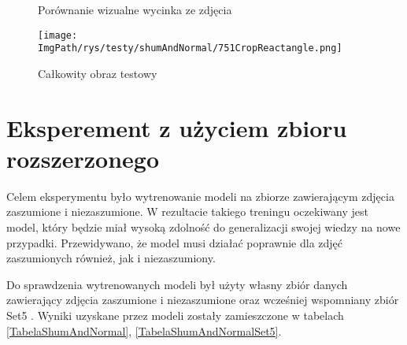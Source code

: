\documentclass[a4paper,12pt,twoside,openany]{report}
\newcommand{\ImgPath}{.}
\begin{document}
	\begin{figure}[!htbp]
		\centering
		\caption{Porównanie wizualne wycinka ze zdjęcia}
		\label{fig:cropShum}
	\end{figure}
	\begin{figure}[!htbp]
	\begin{center}
		\centering
		\texttt{[image: \\ImgPath/rys/testy/shumAndNormal/751CropReactangle.png]}
	\end{center}
	\caption{Całkowity obraz testowy}
	\label{FullImage}
	\end{figure}
\newpage
\section{Eksperement z użyciem zbioru rozszerzonego}
	\label{SecondEksp}
	Celem eksperymentu było wytrenowanie modeli na zbiorze zawierającym zdjęcia zaszumione i niezaszumione. W rezultacie takiego treningu oczekiwany jest model, który będzie miał wysoką zdolność do generalizacji swojej wiedzy na nowe przypadki. Przewidywano, że model musi działać poprawnie dla zdjęć zaszumionych również, jak i niezaszumiony.
	
	Do sprawdzenia wytrenowanych modeli był użyty własny zbiór danych zawierający zdjęcia zaszumione i niezaszumione oraz wcześniej wspomniany zbiór Set5 \cite{Set5}. Wyniki uzyskane przez modeli zostały zamieszczone w tabelach \ref{TabelaShumAndNormal}, \ref{TabelaShumAndNormalSet5}.
	
\end{document}
